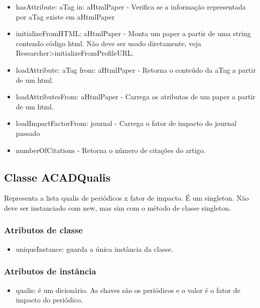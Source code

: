 \begin{itemize}

  \item hasAttribute: aTag in: aHtmlPaper - Verifica se a informação representada por aTag existe em aHtmlPaper
 
  \item initializeFromHTML: aHtmlPaper - Monta um paper a partir de uma string contendo código html. Não deve ser usado diretamente, veja Researcher>initializeFromProfileURL.
  
  \item loadAttribute: aTag from: aHtmlPaper - Retorna o conteúdo da aTag a partir de um html.
  
  \item loadAttributesFrom: aHtmlPaper - Carrega os atributos de um paper a partir de um html.
  
  \item loadImpactFactorFrom: journal - Carrega o fator de impacto do journal passado
  
  \item numberOfCitations - Retorna o número de citações do artigo.

\end{itemize}

\subsection{Classe ACADQualis}

Representa a lista qualis de periódicos x fator de impacto. É um singleton. Não deve ser instanciado com new, mas sim com o método de classe singleton.

\subsubsection{Atributos de classe}

\begin{itemize}
  \item uniqueInstance: guarda a única instância da classe.
\end{itemize}

\subsubsection{Atributos de instância}

\begin{itemize}
  \item qualis: é um dicionário. As chaves são os periódicos e o valor é o fator de impacto do periódico.
\end{itemize}

